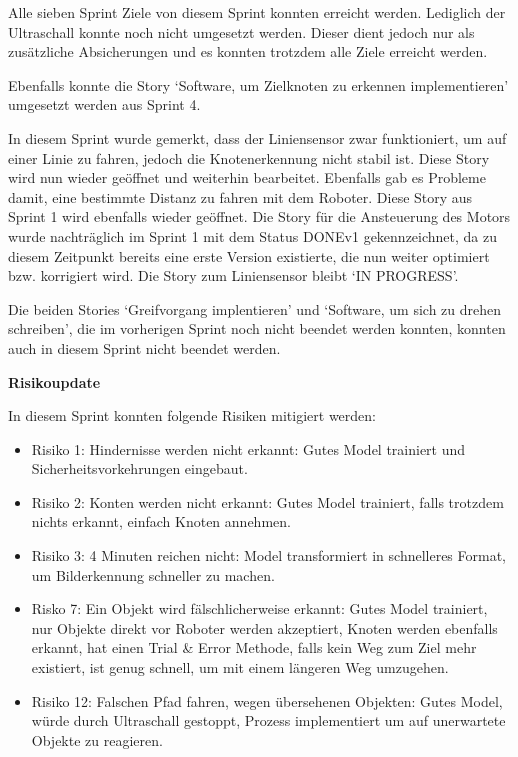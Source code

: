 Alle sieben Sprint Ziele von diesem Sprint konnten erreicht werden. Lediglich der Ultraschall konnte noch nicht umgesetzt werden. Dieser dient jedoch nur als zusätzliche Absicherungen und es konnten trotzdem alle Ziele erreicht werden.

Ebenfalls konnte die Story `Software, um Zielknoten zu erkennen implementieren' umgesetzt werden aus Sprint 4.

In diesem Sprint wurde gemerkt, dass der Liniensensor zwar funktioniert, um auf einer Linie zu fahren, jedoch die Knotenerkennung nicht stabil ist. Diese Story wird nun wieder geöffnet und weiterhin bearbeitet. Ebenfalls gab es Probleme damit, eine bestimmte Distanz zu fahren mit dem Roboter. Diese Story aus Sprint 1 wird ebenfalls wieder geöffnet. Die Story für die Ansteuerung des Motors wurde nachträglich im Sprint 1  mit dem Status DONEv1 gekennzeichnet, da zu diesem Zeitpunkt bereits eine erste Version existierte, die nun weiter optimiert bzw. korrigiert wird. Die Story zum Liniensensor bleibt `IN PROGRESS'.

Die beiden Stories `Greifvorgang implentieren' und `Software, um sich zu drehen schreiben', die im vorherigen Sprint noch nicht beendet werden konnten, konnten auch in diesem Sprint nicht beendet werden.


\textbf{Risikoupdate}

In diesem Sprint konnten folgende Risiken mitigiert werden:

\begin{itemize}
    \item Risiko 1: Hindernisse werden nicht erkannt: Gutes Model trainiert und Sicherheitsvorkehrungen eingebaut.
    \item Risiko 2: Konten werden nicht erkannt: Gutes Model trainiert, falls trotzdem nichts erkannt, einfach Knoten annehmen.
    \item Risiko 3: 4 Minuten reichen nicht: Model transformiert in schnelleres Format, um Bilderkennung schneller zu machen.
    \item Risko 7: Ein Objekt wird fälschlicherweise erkannt: Gutes Model trainiert, nur Objekte direkt vor Roboter werden akzeptiert, Knoten werden ebenfalls erkannt, hat einen Trial \& Error Methode, falls kein Weg zum Ziel mehr existiert, ist genug schnell, um mit einem längeren Weg umzugehen.
    \item Risiko 12: Falschen Pfad fahren, wegen übersehenen Objekten: Gutes Model, würde durch Ultraschall gestoppt, Prozess implementiert um auf unerwartete Objekte zu reagieren.
    
\end{itemize}

